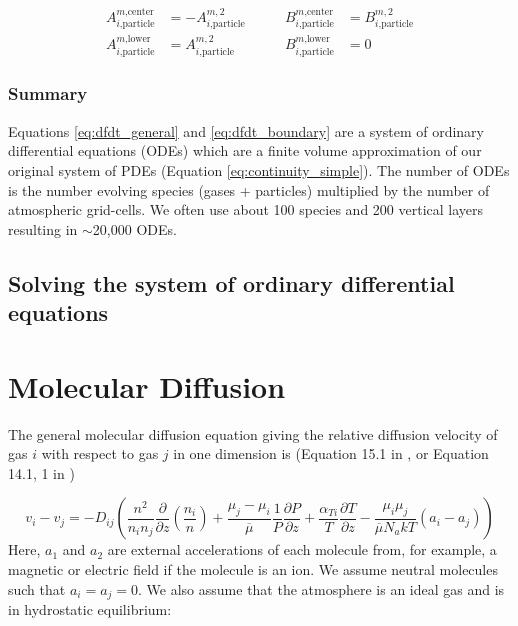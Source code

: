 \begin{equation*}
  \begin{aligned}
  A_{i\text{,particle}}^{m\text{,center}} &= - A_{i\text{,particle}}^{m,2} \\
  A_{i\text{,particle}}^{m\text{,lower}} &= A_{i\text{,particle}}^{m,2}
  \end{aligned}
  \quad\quad
  \begin{aligned}
  B_{i\text{,particle}}^{m\text{,center}} &= B_{i\text{,particle}}^{m,2} \\
  B_{i\text{,particle}}^{m\text{,lower}} &= 0
  \end{aligned}
\end{equation*}

\subsubsection{Summary}

Equations \eqref{eq:dfdt_general} and \eqref{eq:dfdt_boundary} are a system of ordinary differential equations (ODEs) which are a finite volume approximation of our original system of PDEs (Equation \eqref{eq:continuity_simple}). The number of ODEs is the number evolving species (gases + particles) multiplied by the number of atmospheric grid-cells. We often use about 100 species and 200 vertical layers resulting in $\sim$20,000 ODEs.

\subsection{Solving the system of ordinary differential equations}

\section{Molecular Diffusion} \label{sec:molecular_diffusion}

The general molecular diffusion equation giving the relative diffusion velocity of gas $i$ with respect to gas $j$ in one dimension is (Equation 15.1 in \cite{Banks_2013}, or Equation 14.1, 1 in \cite{Chapman_1990})

\begin{equation} \label{eq:molec_diffusion_general}
  v_i - v_j = -D_{ij} \left( \frac{n^2}{n_i n_j} \frac{\partial}{\partial z} \left(\frac{n_i}{n}\right) + \frac{\mu_j - \mu_i}{\overline{\mu}} \frac{1}{P} \frac{\partial P}{\partial z} + \frac{\alpha_{Ti}}{T} \frac{\partial T}{\partial z} - \frac{\mu_i \mu_j}{\overline{\mu} N_a k T} (a_i - a_j)\right)
\end{equation}
Here, $a_1$ and $a_2$ are external accelerations of each molecule from, for example, a magnetic or electric field if the molecule is an ion. We assume neutral molecules such that $a_i = a_j = 0$. We also assume that the atmosphere is an ideal gas and is in hydrostatic equilibrium:

